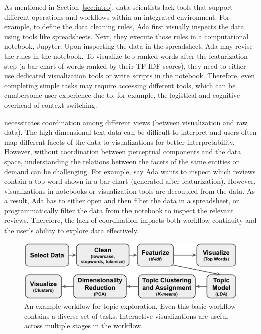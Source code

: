  As mentioned in Section~\ref{sec:intro}, data scientists lack tools 
that support different \vita operations and workflows within an integrated environment.
For example, to define the data cleaning rules, Ada first visually inspects the data using tools like spreadsheets. Next, they execute those rules in a computational notebook, \eg Jupyter. Upon inspecting the data in the spreadsheet, Ada may revise the rules in the notebook. To visualize top-ranked words after the featurization step (\eg a bar chart of words ranked by their TF-IDF scores), they need to either use dedicated visualization tools or write scripts in the notebook. Therefore, even completing simple tasks may require accessing different tools, which can be cumbersome user experience due to, for example, the logistical and cognitive overhead of context switching.
 
  \vita necessitates coordination among different views (\eg between visualization and raw data).  The high dimensional text data can be difficult to interpret and users often map different facets of the data to visualizations for better interpretability. 
However, without coordination between perceptual components and the data space, understanding the relations between the facets of the same entities on demand can be challenging. 
For example, say Ada wants to inspect which reviews contain a top-word shown in a  bar chart (generated after featurization). However, visualizations in notebooks or visualization tools are decoupled from the data. As a result, Ada has to either open and then filter the data in a spreadsheet, or programmatically filter the data from the notebook to inspect the relevant reviews. Therefore, the lack of coordination impacts both workflow continuity and the user's ability to explore data effectively.
 
\begin{figure}[tbp] 
  \centering
  \includegraphics[width=\linewidth]{figures/workflow.png}
  \caption{\small An example \vita workflow for topic exploration. Even this basic workflow contains a diverse set of tasks. Interactive visualizations are useful across multiple stages in the workflow.\label{fig:workflow}} 
\end{figure}

